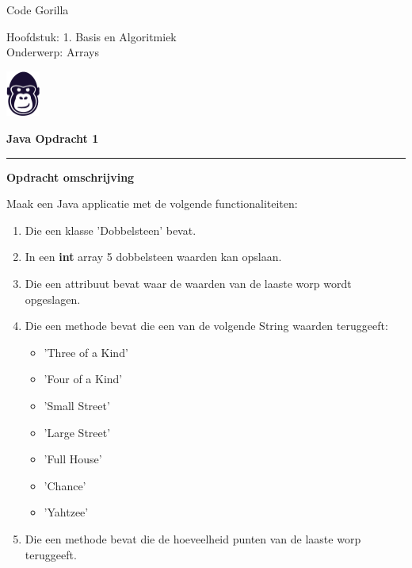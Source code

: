 \documentclass[11pt,letterpaper]{article}
\begin{document}
	\pagestyle{plain}
	\begin{flushleft}
		Code Gorilla \\
		
		\smallskip
		
		Hoofdstuk: 1. Basis en Algoritmiek \\
		Onderwerp: Arrays \\
		
	\end{flushleft}
	
	\begin{flushright}\vspace{-5mm}
		\includegraphics[height=1.5cm]{gorilla.png}
	\end{flushright}
	
	\begin{center}\vspace{-1cm}
		\textbf{ \large Java Opdracht 1 }\\
		
	\end{center}
	
	
	\rule{\linewidth}{0.1mm}
	
	\bigskip
	\textbf{\large{Opdracht omschrijving}}
	\\
	
	\smallskip
	
	Maak een Java applicatie met de volgende functionaliteiten: \\
	\begin{enumerate}
		\item Die een klasse 'Dobbelsteen' bevat.
		\item In een \textbf{int} array 5 dobbelsteen waarden kan opslaan.
		\item Die een attribuut bevat waar de waarden van de laaste worp wordt opgeslagen.
		\item Die een methode bevat die een van de volgende String waarden teruggeeft: 
		\begin{itemize}
			\item 'Three of a Kind'
			\item 'Four of a Kind'
			\item 'Small Street'
			\item 'Large Street'
			\item 'Full House'
			\item 'Chance'
			\item 'Yahtzee'
		\end{itemize}
	\item Die een methode bevat die de hoeveelheid punten van de laaste worp teruggeeft.
	\end{enumerate}
	
\end{document}
